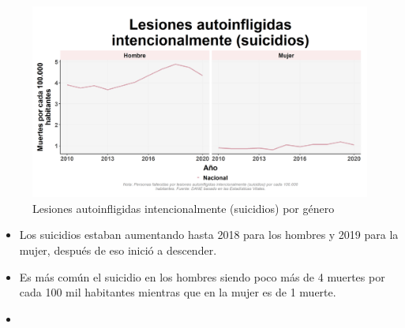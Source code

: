     \begin{figure}[H]
        \caption{Lesiones autoinfligidas intencionalmente (suicidios) por género \label{map_result_2} }
        \begin{center}
        \includegraphics[width=\textwidth,keepaspectratio]{img/var_296_trend.png}
        \end{center}
    \end{figure}
            \begin{itemize}
                \item Los suicidios estaban aumentando hasta 2018 para los hombres y 2019 para la mujer, después de eso inició a descender.
                \item Es más común el suicidio en los hombres siendo poco más de 4 muertes por cada 100 mil habitantes mientras que en la mujer es de 1 muerte.
                \item 
                \end{itemize}

